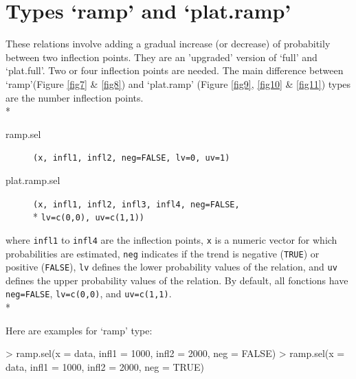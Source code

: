 \documentclass[letterpaper, 12pt]{article}
\begin{document}

\newpage

\section{Types `ramp' and `plat.ramp'}
\noindent These relations involve adding a gradual increase (or decrease) of probabitily between two inflection points. 
They are an 'upgraded' version of `full' and `plat.full'. Two or four inflection points are needed. 
The main difference between `ramp'(Figure \ref{fig7} \& \ref{fig8}) and `plat.ramp' (Figure \ref{fig9}, \ref{fig10} \& \ref{fig11}) 
types are the number inflection points.\\*
			
\begin{description}
\item[ramp.sel]\verb#(x, infl1, infl2, neg=FALSE, lv=0, uv=1)#
\item[plat.ramp.sel]\verb#(x, infl1, infl2, infl3, infl4, neg=FALSE,# \\* \verb#lv=c(0,0), uv=c(1,1))#
\end{description}
where \verb#infl1# to \verb#infl4# are the inflection points, \verb#x# is a numeric vector for which probabilities are 
estimated, \verb#neg# indicates if the trend is negative  (\verb#TRUE#) or positive (\verb#FALSE#), \verb#lv# defines the 
lower probability values of the relation, and \verb#uv# defines the upper probability values of the relation. By default, 
all fonctions have \verb#neg=FALSE#, \verb#lv=c(0,0)#, and \verb#uv=c(1,1)#.\\*

Here are examples for `ramp' type:
\begin{Schunk}
\begin{Sinput}
> ramp.sel(x = data, infl1 = 1000, infl2 = 2000, neg = FALSE)
> ramp.sel(x = data, infl1 = 1000, infl2 = 2000, neg = TRUE)
\end{Sinput}
\end{Schunk}
\end{document}
